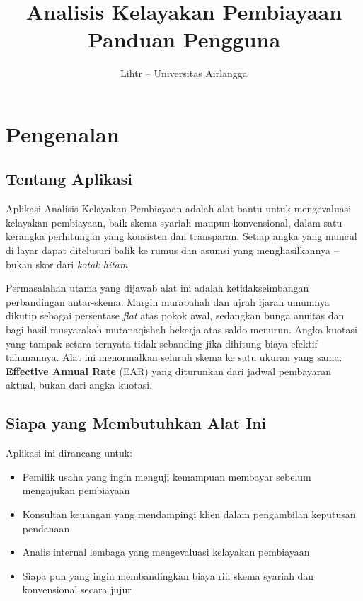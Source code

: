 \documentclass[12pt,a4paper,twoside]{report}
\title{\Huge\textcolor{deepteal}{Analisis Kelayakan Pembiayaan}\\[6pt]
       \Large Panduan Pengguna}
\author{Lihtr -- Universitas Airlangga}
\date{}
\begin{document}
\maketitle
\thispagestyle{empty}
\newpage

\tableofcontents
\newpage

\chapter{Pengenalan}

\section{Tentang Aplikasi}

Aplikasi Analisis Kelayakan Pembiayaan adalah alat bantu untuk mengevaluasi kelayakan pembiayaan, baik skema syariah maupun konvensional, dalam satu kerangka perhitungan yang konsisten dan transparan. Setiap angka yang muncul di layar dapat ditelusuri balik ke rumus dan asumsi yang menghasilkannya -- bukan skor dari \emph{kotak hitam}.

Permasalahan utama yang dijawab alat ini adalah ketidakseimbangan perbandingan antar-skema. Margin murabahah dan ujrah ijarah umumnya dikutip sebagai persentase \emph{flat} atas pokok awal, sedangkan bunga anuitas dan bagi hasil musyarakah mutanaqishah bekerja atas saldo menurun. Angka kuotasi yang tampak setara ternyata tidak sebanding jika dihitung biaya efektif tahunannya. Alat ini menormalkan seluruh skema ke satu ukuran yang sama: \textbf{Effective Annual Rate} (EAR) yang diturunkan dari jadwal pembayaran aktual, bukan dari angka kuotasi.

\section{Siapa yang Membutuhkan Alat Ini}

Aplikasi ini dirancang untuk:
\begin{itemize}
  \item Pemilik usaha yang ingin menguji kemampuan membayar sebelum mengajukan pembiayaan
  \item Konsultan keuangan yang mendampingi klien dalam pengambilan keputusan pendanaan
  \item Analis internal lembaga yang mengevaluasi kelayakan pembiayaan
  \item Siapa pun yang ingin membandingkan biaya riil skema syariah dan konvensional secara jujur
\end{itemize}
\end{document}
